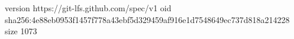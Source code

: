 version https://git-lfs.github.com/spec/v1
oid sha256:4e88eb0953f1457f778a43ebf5d329459af916e1d7548649ec737d818a214228
size 1073
